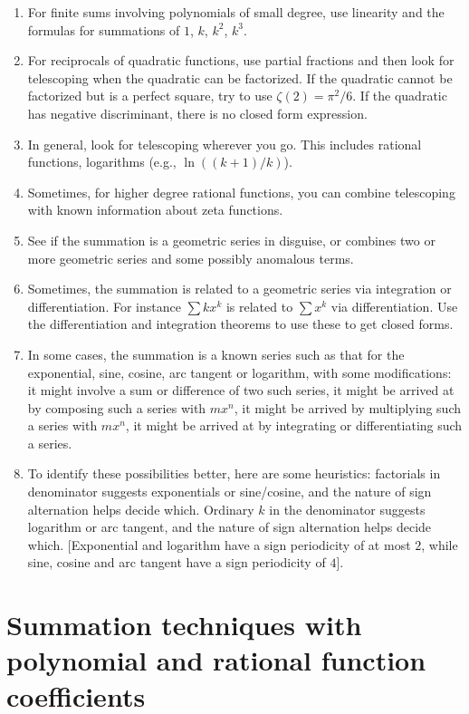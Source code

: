 \documentclass{amsart}
\begin{document}
\begin{enumerate}
\item For finite sums involving polynomials of small degree, use
  linearity and the formulas for summations of $1$, $k$, $k^2$, $k^3$.
\item For reciprocals of quadratic functions, use partial fractions
  and then look for telescoping when the quadratic can be
  factorized. If the quadratic cannot be factorized but is a perfect
  square, try to use $\zeta(2) = \pi^2/6$. If the quadratic has
  negative discriminant, there is no closed form expression.
\item In general, look for telescoping wherever you go. This includes
  rational functions, logarithms (e.g., $\ln((k + 1)/k)$).
\item Sometimes, for higher degree rational functions, you can combine
  telescoping with known information about zeta functions.
\item See if the summation is a geometric series in disguise, or
  combines two or more geometric series and some possibly anomalous
  terms.
\item Sometimes, the summation is related to a geometric series via
  integration or differentiation. For instance $\sum kx^k$ is related
  to $\sum x^k$ via differentiation. Use the differentiation and
  integration theorems to use these to get closed forms.
\item In some cases, the summation is a known series such as that for
  the exponential, sine, cosine, arc tangent or logarithm, with some
  modifications: it might involve a sum or difference of two such
  series, it might be arrived at by composing such a series with
  $mx^n$, it might be arrived by multiplying such a series with
  $mx^n$, it might be arrived at by integrating or differentiating
  such a series.
\item To identify these possibilities better, here are some
  heuristics: factorials in denominator suggests exponentials or
  sine/cosine, and the nature of sign alternation helps decide
  which. Ordinary $k$ in the denominator suggests logarithm or arc
  tangent, and the nature of sign alternation helps decide
  which. [Exponential and logarithm have a sign periodicity of at most
  $2$, while sine, cosine and arc tangent have a sign periodicity of
  $4$].
\end{enumerate}

\section{Summation techniques with polynomial and rational function coefficients}
\end{document}
